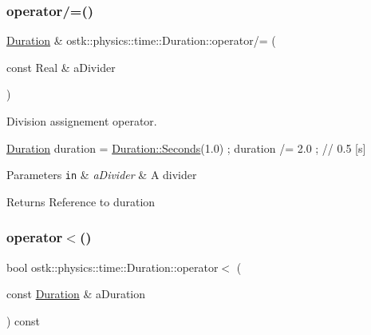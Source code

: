 \subsubsection{\texorpdfstring{operator/=()}{operator/=()}}
{\footnotesize\ttfamily \hyperlink{classostk_1_1physics_1_1time_1_1_duration}{Duration} \& ostk\+::physics\+::time\+::\+Duration\+::operator/= (\begin{DoxyParamCaption}\item[{const Real \&}]{a\+Divider }\end{DoxyParamCaption})}



Division assignement operator. 


\begin{DoxyCode}
\hyperlink{classostk_1_1physics_1_1time_1_1_duration_a6ba3a020742ca6e3bf0b1970dd039c07}{Duration} duration = \hyperlink{classostk_1_1physics_1_1time_1_1_duration_ad973fa34fcc308fdcc8d50c3ee694764}{Duration::Seconds}(1.0) ;
duration /= 2.0 ; \textcolor{comment}{// 0.5 [s]}
\end{DoxyCode}



\begin{DoxyParams}[1]{Parameters}
\mbox{\tt in}  & {\em a\+Divider} & A divider \\
\hline
\end{DoxyParams}
\begin{DoxyReturn}{Returns}
Reference to duration 
\end{DoxyReturn}
\mbox{\label{classostk_1_1physics_1_1time_1_1_duration_a76fbb444ae7db2e6e61c237bf96b9032}} 
\subsubsection{\texorpdfstring{operator$<$()}{operator<()}}
{\footnotesize\ttfamily bool ostk\+::physics\+::time\+::\+Duration\+::operator$<$ (\begin{DoxyParamCaption}\item[{const \hyperlink{classostk_1_1physics_1_1time_1_1_duration}{Duration} \&}]{a\+Duration }\end{DoxyParamCaption}) const}



